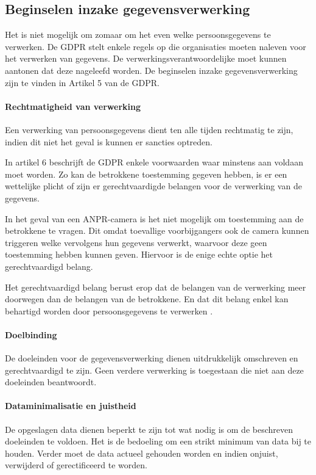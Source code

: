 \subsection{Beginselen inzake gegevensverwerking}
Het is niet mogelijk om zomaar om het even welke persoonsgegevens te verwerken. De GDPR stelt enkele regels op die organisaties moeten naleven voor het verwerken van gegevens. De verwerkingsverantwoordelijke moet kunnen aantonen dat deze nageleefd worden. De beginselen inzake gegevensverwerking zijn te vinden in Artikel 5 van de GDPR.

\paragraph{Rechtmatigheid van verwerking}
\label{rechtmatigheid-van-verwerking}
Een verwerking van persoonsgegevens dient ten alle tijden rechtmatig te zijn, indien dit niet het geval is kunnen er sancties optreden.

In artikel 6 beschrijft de GDPR enkele voorwaarden waar minstens aan voldaan moet worden. Zo kan de betrokkene toestemming gegeven hebben, is er een wettelijke plicht of zijn er gerechtvaardigde belangen voor de verwerking van de gegevens.

In het geval van een ANPR-camera is het niet mogelijk om toestemming aan de betrokkene te vragen. Dit omdat toevallige voorbijgangers ook de camera kunnen triggeren welke vervolgens hun gegevens verwerkt, waarvoor deze geen toestemming hebben kunnen geven. Hiervoor is de enige echte optie het gerechtvaardigd belang.

Het gerechtvaardigd belang berust erop dat de belangen van de verwerking meer doorwegen dan de belangen van de betrokkene. En dat dit belang enkel kan behartigd worden door persoonsgegevens te verwerken \autocite{autoriteit2019gerechtvaardigd}.

\paragraph{Doelbinding}
De doeleinden voor de gegevensverwerking dienen uitdrukkelijk omschreven en gerechtvaardigd te zijn. Geen verdere verwerking is toegestaan die niet aan deze doeleinden beantwoordt.

\paragraph{Dataminimalisatie en juistheid}
De opgeslagen data dienen beperkt te zijn tot wat nodig is om de beschreven doeleinden te voldoen. Het is de bedoeling om een strikt minimum van data bij te houden. Verder moet de data actueel gehouden worden en indien onjuist, verwijderd of gerectificeerd te worden.

